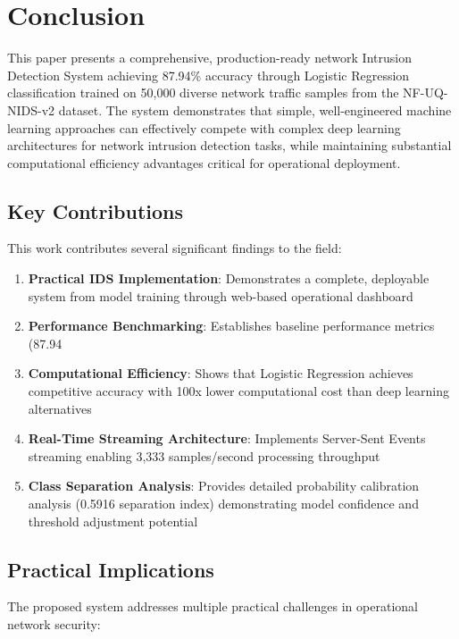\documentclass[conference]{IEEEtran}
\begin{document}
\section{Conclusion}

This paper presents a comprehensive, production-ready network Intrusion Detection System achieving 87.94\% accuracy through Logistic Regression classification trained on 50,000 diverse network traffic samples from the NF-UQ-NIDS-v2 dataset. The system demonstrates that simple, well-engineered machine learning approaches can effectively compete with complex deep learning architectures for network intrusion detection tasks, while maintaining substantial computational efficiency advantages critical for operational deployment.

\subsection{Key Contributions}

This work contributes several significant findings to the field:

\begin{enumerate}
    \item \textbf{Practical IDS Implementation}: Demonstrates a complete, deployable system from model training through web-based operational dashboard
    \item \textbf{Performance Benchmarking}: Establishes baseline performance metrics (87.94%
    \item \textbf{Computational Efficiency}: Shows that Logistic Regression achieves competitive accuracy with 100x lower computational cost than deep learning alternatives
    \item \textbf{Real-Time Streaming Architecture}: Implements Server-Sent Events streaming enabling 3,333 samples/second processing throughput
    \item \textbf{Class Separation Analysis}: Provides detailed probability calibration analysis (0.5916 separation index) demonstrating model confidence and threshold adjustment potential
\end{enumerate}

\subsection{Practical Implications}

The proposed system addresses multiple practical challenges in operational network security:
\end{document}
